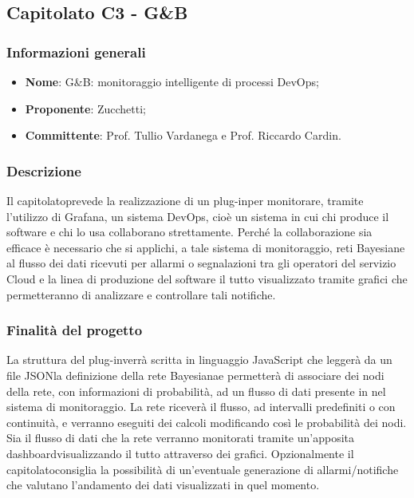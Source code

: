 \subsection{Capitolato C3 - G\&B}
\subsubsection{Informazioni generali}
\begin{itemize}
	\item \textbf{Nome}: G\&B: monitoraggio intelligente di processi DevOps\glo;
	\item \textbf{Proponente}: Zucchetti;
	\item \textbf{Committente}: Prof. Tullio Vardanega e Prof. Riccardo Cardin.
\end{itemize}
\subsubsection{Descrizione}
Il capitolato\glosp prevede la realizzazione di un plug-in\glosp per monitorare, tramite l'utilizzo di Grafana\glo, un sistema DevOps\glo, cioè un sistema in cui chi produce il software e chi lo usa collaborano strettamente. Perché la collaborazione sia efficace è necessario che si applichi, a tale sistema di monitoraggio, reti Bayesiane al flusso dei dati ricevuti per allarmi o segnalazioni tra gli operatori del servizio Cloud e la linea di produzione del software il tutto visualizzato tramite grafici che permetteranno di analizzare e controllare tali notifiche.
\subsubsection{Finalità del progetto}
La struttura del plug-in\glosp verrà scritta in linguaggio JavaScript che leggerà da un file JSON\glosp la definizione della rete Bayesiana\glosp e permetterà di associare dei nodi della rete, con informazioni di probabilità, ad un flusso di dati presente in nel sistema di monitoraggio. La rete riceverà il flusso, ad intervalli predefiniti o con continuità, e verranno eseguiti dei calcoli modificando così le probabilità dei nodi. Sia il flusso di dati che la rete verranno monitorati tramite un'apposita dashboard\glosp visualizzando il tutto attraverso dei grafici. Opzionalmente il capitolato\glosp consiglia la possibilità di	un'eventuale generazione di allarmi/notifiche che valutano l'andamento dei dati visualizzati in quel momento.
